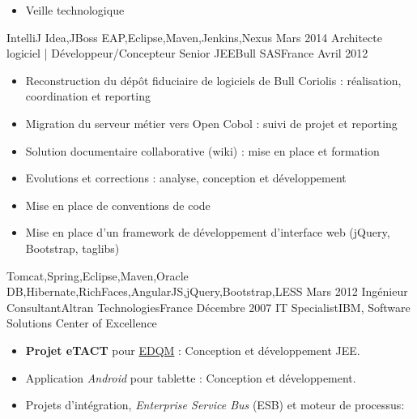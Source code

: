 \begin{experiences}
{\begin{itemize}
                        \item Veille technologique                                                                    
                      \end{itemize}
                    }
                    {IntelliJ Idea,JBoss EAP,Eclipse,Maven,Jenkins,Nexus}
  \emptySeparator
  \experience
    {Mars 2014}     {Architecte logiciel | Développeur/Concepteur Senior JEE}{Bull SAS}{France}
    {Avril 2012}    {
                      \begin{itemize}
                        \item Reconstruction du dépôt fiduciaire de logiciels de Bull Coriolis : réalisation, coordination et reporting
                        \item Migration du serveur métier vers Open Cobol : suivi de projet et reporting                
                        \item Solution documentaire collaborative (wiki) : mise en place et formation                   
                        \item Evolutions et corrections : analyse, conception et développement                          
                        \item Mise en place de conventions de code                                                      
                        \item Mise en place d'un framework de développement d'interface web (jQuery, Bootstrap, taglibs)
                      \end{itemize}
                    }
                    {Tomcat,Spring,Eclipse,Maven,Oracle DB,Hibernate,RichFaces,AngularJS,jQuery,Bootstrap,LESS}
  \emptySeparator
  \consultantexperience
  {Mars 2012}       {Ingénieur Consultant}{Altran Technologies}{France}
  {Décembre 2007}   {IT Specialist}{IBM, Software Solutions Center of Excellence}
                    {
                      \begin{itemize}
                        \item \textbf{Projet eTACT} pour \href{https://www.edqm.eu/fr/contexte-mission-cd-p-phcmed.html}{EDQM} : Conception et développement JEE.
                        \item Application \emph{Android} pour tablette : Conception et développement.
                        \item Projets d'intégration, \emph{Enterprise Service Bus} (ESB) et moteur de processus:
                        \begin{itemize}

\end{itemize}
\end{itemize}}
\end{experiences}
